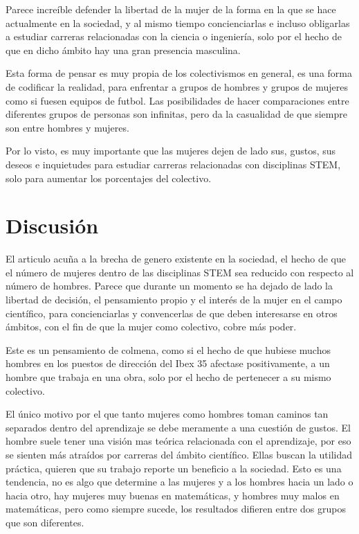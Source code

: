 Parece increíble defender la libertad de la mujer de la forma en la que se hace actualmente en la sociedad, 
y al mismo tiempo concienciarlas e incluso obligarlas a estudiar carreras relacionadas con la ciencia o ingeniería,
solo por el hecho de que en dicho ámbito hay una gran presencia masculina. 

Esta forma de pensar es muy propia de los colectivismos en general, es una forma de codificar la realidad, para 
enfrentar a grupos de hombres y grupos de mujeres como si fuesen equipos de futbol. Las posibilidades de hacer 
comparaciones entre diferentes grupos de personas son infinitas, pero da la casualidad de que siempre son entre 
hombres y mujeres. 

Por lo visto, es muy importante que las mujeres dejen de lado sus, gustos, sus deseos e inquietudes para estudiar 
carreras relacionadas con disciplinas STEM, solo para aumentar los porcentajes del colectivo.

\section{Discusión}
\label{sec:discusion}

El articulo acuña a la brecha de genero existente en la sociedad, el hecho de que el número de mujeres dentro de las 
disciplinas STEM sea reducido con respecto al número de hombres. Parece que durante un momento se ha dejado de 
lado la libertad de decisión, el pensamiento propio y el interés de la mujer en el campo científico, para concienciarlas y 
convencerlas de que deben interesarse en otros ámbitos, con el fin de que la mujer como colectivo, cobre más poder.

Este es un pensamiento de colmena, como si el hecho de que hubiese muchos hombres en los puestos de dirección del 
Ibex 35 afectase positivamente, a un hombre que trabaja en una obra, solo por el hecho de pertenecer a su mismo colectivo.

El único motivo por el que tanto mujeres como hombres toman caminos tan separados dentro del aprendizaje se debe 
meramente a una cuestión de gustos. El hombre suele tener una visión mas teórica relacionada con el aprendizaje, por 
eso se sienten más atraídos por carreras del ámbito científico. Ellas buscan la utilidad práctica, quieren que su trabajo 
reporte un beneficio a la sociedad. Esto es una tendencia, no es algo que determine a las mujeres y a los hombres hacia 
un lado o hacia otro, hay mujeres muy buenas en matemáticas, y hombres muy malos en matemáticas, pero como siempre 
sucede, los resultados difieren entre dos grupos que son diferentes.

